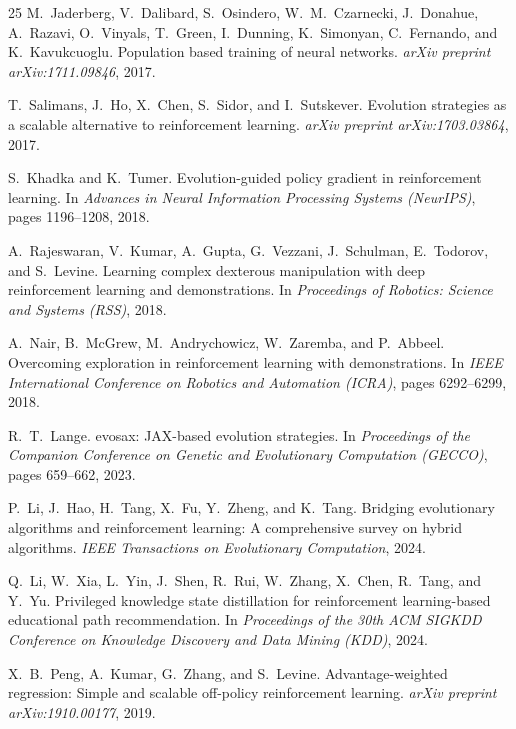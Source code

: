\documentclass[sigconf,anonymous]{acmart}
\begin{document}
\begin{thebibliography}{25}
M.~Jaderberg, V.~Dalibard, S.~Osindero, W.~M.~Czarnecki, J.~Donahue, A.~Razavi, O.~Vinyals, T.~Green, I.~Dunning, K.~Simonyan, C.~Fernando, and K.~Kavukcuoglu.
\newblock Population based training of neural networks.
\newblock \emph{arXiv preprint arXiv:1711.09846}, 2017.

T.~Salimans, J.~Ho, X.~Chen, S.~Sidor, and I.~Sutskever.
\newblock Evolution strategies as a scalable alternative to reinforcement learning.
\newblock \emph{arXiv preprint arXiv:1703.03864}, 2017.

S.~Khadka and K.~Tumer.
\newblock Evolution-guided policy gradient in reinforcement learning.
\newblock In \emph{Advances in Neural Information Processing Systems (NeurIPS)}, pages 1196--1208, 2018.

A.~Rajeswaran, V.~Kumar, A.~Gupta, G.~Vezzani, J.~Schulman, E.~Todorov, and S.~Levine.
\newblock Learning complex dexterous manipulation with deep reinforcement learning and demonstrations.
\newblock In \emph{Proceedings of Robotics: Science and Systems (RSS)}, 2018.

A.~Nair, B.~McGrew, M.~Andrychowicz, W.~Zaremba, and P.~Abbeel.
\newblock Overcoming exploration in reinforcement learning with demonstrations.
\newblock In \emph{IEEE International Conference on Robotics and Automation (ICRA)}, pages 6292--6299, 2018.

R.~T.~Lange.
\newblock evosax: JAX-based evolution strategies.
\newblock In \emph{Proceedings of the Companion Conference on Genetic and Evolutionary Computation (GECCO)}, pages 659--662, 2023.

P.~Li, J.~Hao, H.~Tang, X.~Fu, Y.~Zheng, and K.~Tang.
\newblock Bridging evolutionary algorithms and reinforcement learning: A comprehensive survey on hybrid algorithms.
\newblock \emph{IEEE Transactions on Evolutionary Computation}, 2024.

Q.~Li, W.~Xia, L.~Yin, J.~Shen, R.~Rui, W.~Zhang, X.~Chen, R.~Tang, and Y.~Yu.
\newblock Privileged knowledge state distillation for reinforcement learning-based educational path recommendation.
\newblock In \emph{Proceedings of the 30th ACM SIGKDD Conference on Knowledge Discovery and Data Mining (KDD)}, 2024.

X.~B.~Peng, A.~Kumar, G.~Zhang, and S.~Levine.
\newblock Advantage-weighted regression: Simple and scalable off-policy reinforcement learning.
\newblock \emph{arXiv preprint arXiv:1910.00177}, 2019.


\end{thebibliography}
\end{document}
